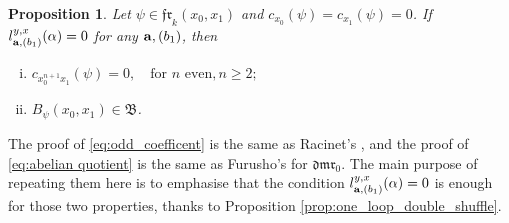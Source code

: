 \documentclass[a4paper,fleqn]{cas-sc}
\newtheorem{proposition}[theorem]{Proposition}
\begin{document}
\begin{proposition}\label{prop:main_property}
Let $\psi\in \mathfrak{fr}_k(x_0,x_1)$ and $c_{x_0}(\psi)=c_{x_1}(\psi)=0$. If $l^{y,x}_{{\bf{a}},(b_1)}(\alpha)=0$ for any ${\bf{a}},(b_1)$, then 

\begin{enumerate}[(i)]
    \item \label{eq:odd_coefficent}
    $c_{x_0^{n+1}x_1}(\psi)=0, \quad \text{for } n \text{ even}, n\ge 2; $
    \item \label{eq:abelian quotient}
	$B_{\psi}(x_0,x_1)\in \mathfrak{B}$.
\end{enumerate}

\end{proposition}

\begin{rmk}
 The proof of \eqref{eq:odd_coefficent} is the same as Racinet's \cite{Racinet2002}, and the proof of \eqref{eq:abelian quotient} is the same as Furusho's \cite{Furusho2011} for $\mathfrak{dmr}_0$.
The main purpose of repeating them here is to emphasise that the condition $l^{y,x}_{{\bf{a}},(b_1)}(\alpha)=0$ is enough for those two properties, thanks to Proposition \ref{prop:one_loop_double_shuffle}.
\end{rmk}
\end{document}
